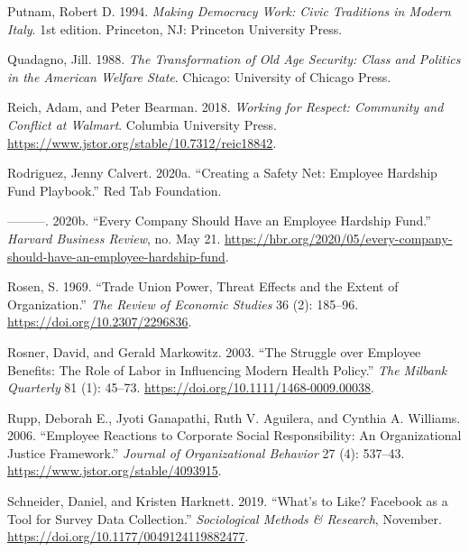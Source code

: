 \documentclass[
  11pt,
  oneside]{article}
\newlength{\cslhangindent}
\newenvironment{CSLReferences}[2] %
 {\begin{list}{}{%
  \setlength{\itemindent}{0pt}
  \setlength{\leftmargin}{0pt}
  \setlength{\parsep}{0pt}
  \ifodd #1
   \setlength{\leftmargin}{\cslhangindent}
   \setlength{\itemindent}{-1\cslhangindent}
  \fi
  \setlength{\itemsep}{#2\baselineskip}}}
 {\end{list}}
\begin{document}
\begin{CSLReferences}{1}{0}
Putnam, Robert D. 1994. \emph{Making {Democracy} {Work}: {Civic} {Traditions} in {Modern} {Italy}}. 1st edition. Princeton, NJ: Princeton University Press.

Quadagno, Jill. 1988. \emph{The {Transformation} of {Old} {Age} {Security}: {Class} and {Politics} in the {American} {Welfare} {State}}. Chicago: University of Chicago Press.

Reich, Adam, and Peter Bearman. 2018. \emph{Working for {Respect}: {Community} and {Conflict} at {Walmart}}. Columbia University Press. \url{https://www.jstor.org/stable/10.7312/reic18842}.

Rodriguez, Jenny Calvert. 2020a. {``Creating a {Safety} {Net}: {Employee} {Hardship} {Fund} {Playbook}.''} Red Tab Foundation.

---------. 2020b. {``Every {Company} {Should} {Have} an {Employee} {Hardship} {Fund}.''} \emph{Harvard Business Review}, no. May 21. \url{https://hbr.org/2020/05/every-company-should-have-an-employee-hardship-fund}.

Rosen, S. 1969. {``Trade {Union Power}, {Threat Effects} and the {Extent} of {Organization}.''} \emph{The Review of Economic Studies} 36 (2): 185--96. \url{https://doi.org/10.2307/2296836}.

Rosner, David, and Gerald Markowitz. 2003. {``The {Struggle} over {Employee} {Benefits}: {The} {Role} of {Labor} in {Influencing} {Modern} {Health} {Policy}.''} \emph{The Milbank Quarterly} 81 (1): 45--73. \url{https://doi.org/10.1111/1468-0009.00038}.

Rupp, Deborah E., Jyoti Ganapathi, Ruth V. Aguilera, and Cynthia A. Williams. 2006. {``Employee {Reactions} to {Corporate Social Responsibility}: {An Organizational Justice Framework}.''} \emph{Journal of Organizational Behavior} 27 (4): 537--43. \url{https://www.jstor.org/stable/4093915}.

Schneider, Daniel, and Kristen Harknett. 2019. {``What's to {Like}? {Facebook} as a {Tool} for {Survey} {Data} {Collection}.''} \emph{Sociological Methods \& Research}, November. \url{https://doi.org/10.1177/0049124119882477}.


\end{CSLReferences}
\end{document}
